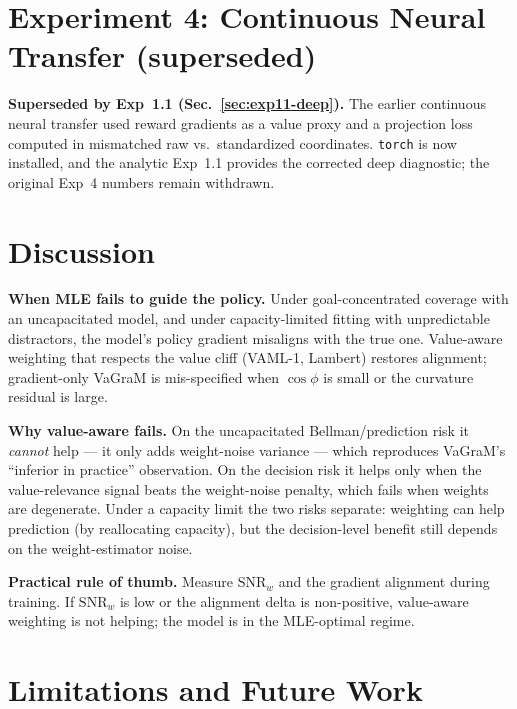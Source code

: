 \documentclass[11pt]{article}
\begin{document}


\section{Experiment 4: Continuous Neural Transfer (superseded)}

\textbf{Superseded by Exp~1.1 (Sec.~\ref{sec:exp11-deep}).} The earlier continuous
neural transfer used reward gradients as a value proxy and a projection loss computed in
mismatched raw vs.\ standardized coordinates. \texttt{torch} is now installed, and the
analytic Exp~1.1 provides the corrected deep diagnostic; the original Exp~4 numbers
remain withdrawn.

\section{Discussion}

\textbf{When MLE fails to guide the policy.} Under goal-concentrated coverage with an
uncapacitated model, and under capacity-limited fitting with unpredictable distractors,
the model's policy gradient misaligns with the true one. Value-aware weighting that
respects the value cliff (VAML-1, Lambert) restores alignment; gradient-only VaGraM is
mis-specified when $\cos\phi$ is small or the curvature residual is large.

\textbf{Why value-aware fails.} On the uncapacitated Bellman/prediction risk it
\emph{cannot} help --- it only adds weight-noise variance --- which reproduces VaGraM's
``inferior in practice'' observation. On the decision risk it helps only when the
value-relevance signal beats the weight-noise penalty, which fails when weights are
degenerate. Under a capacity limit the two risks separate: weighting can help prediction
(by reallocating capacity), but the decision-level benefit still depends on the
weight-estimator noise.

\textbf{Practical rule of thumb.} Measure $\mathrm{SNR}_w$ and the gradient alignment
during training. If $\mathrm{SNR}_w$ is low or the alignment delta is non-positive,
value-aware weighting is not helping; the model is in the MLE-optimal regime.

\section{Limitations and Future Work}
\end{document}
